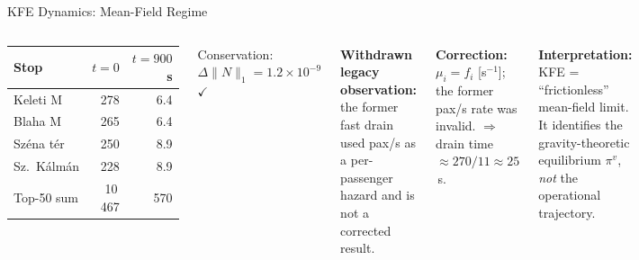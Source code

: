 \documentclass[aspectratio=169,12pt]{beamer}
\begin{document}
\begin{frame}{KFE Dynamics: Mean-Field Regime}
\begin{columns}[T]
\begin{center}
\begin{tabular}{lrr}
\toprule
Stop & $t=0$ & $t=900$\,s \\
\midrule
Keleti M      & 278 & 6.4 \\
Blaha M       & 265 & 6.4 \\
Széna tér     & 250 & 8.9 \\
Sz.~Kálmán    & 228 & 8.9 \\
\midrule
Top-50 sum    & 10\,467 & 570 \\
\bottomrule
\end{tabular}
\end{center}
Conservation: $\Delta\|N\|_1 = 1.2\times10^{-9}$ $\checkmark$

\textbf{Withdrawn legacy observation:} the former fast drain used pax/s as a
per-passenger hazard and is not a corrected result.

\textbf{Correction:} $\mu_i=f_i$ [s$^{-1}$]; the former pax/s rate was invalid.
$\Rightarrow$ drain time $\approx270/11\approx25$\,s.

\textbf{Interpretation:} KFE = ``frictionless'' mean-field limit.
It identifies the gravity-theoretic equilibrium $\pi^v$,
\emph{not} the operational trajectory.
\end{columns}
\end{frame}
\end{document}

